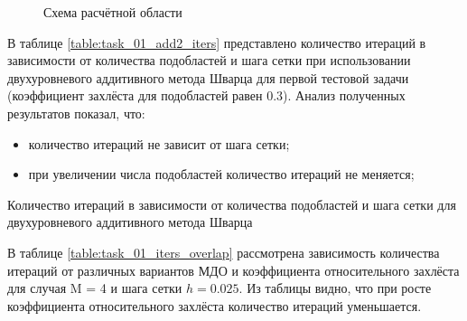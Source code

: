 \documentclass[a4paper]{article}
\begin{document}
\begin{figure}[h]
\caption{Схема расчётной области}
\label{fig:task_01_scheme}
\end{figure}

В таблице \ref{table:task_01_add2_iters} представлено количество итераций в зависимости от количества подобластей и шага сетки при использовании двухуровневого аддитивного метода Шварца для первой тестовой задачи (коэффициент захлёста для подобластей равен 0.3). Анализ полученных результатов показал, что:
\begin{itemize}
\item количество итераций не зависит от шага сетки;
\item при увеличении числа подобластей количество итераций не меняется;
\end{itemize}

\begin{table}[h]
\caption{Количество итераций в зависимости от количества подобластей и шага сетки для двухуровневого аддитивного метода Шварца}
\label{table:task_01_add2_iters}
\end{table}

В таблице \ref{table:task_01_iters_overlap} рассмотрена зависимость количества итераций от различных вариантов МДО и коэффициента относительного захлёста для случая M = 4 и шага сетки $h = 0.025$. Из таблицы видно, что при росте коэффициента относительного захлёста количество итераций уменьшается.
\end{document}
